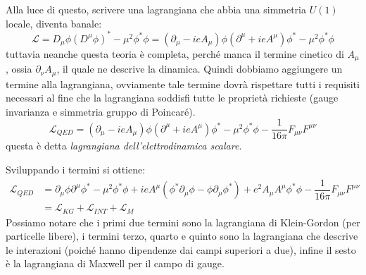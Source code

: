 Alla luce di questo, scrivere una lagrangiana che abbia una simmetria $U(1)$ locale, diventa banale:
\begin{equation}
  \mathcal{L}=D_\mu\phi(D^\mu\phi)^*-\mu^2\phi^*\phi=(\partial_\mu-ieA_\mu)\phi(\partial^\mu+ieA^\mu)\phi^*-\mu^2\phi^*\phi
\end{equation}
tuttavia neanche questa teoria è completa, perché manca il termine cinetico di $A_\mu$, ossia $\partial_\nu A_\mu$, il quale ne descrive la dinamica. Quindi dobbiamo aggiungere un termine alla lagrangiana, ovviamente tale termine dovrà rispettare tutti i requisiti necessari al fine che la lagrangiana soddisfi tutte le proprietà richieste (gauge invarianza e simmetria gruppo di Poincaré).
\begin{equation}
  \mathcal{L}_{QED}=(\partial_\mu-ieA_\mu)\phi(\partial^\mu+ieA^\mu)\phi^*-\mu^2\phi^*\phi-\dfrac{1}{16\pi}F_{\mu\nu}F^{\mu\nu}
\end{equation}
questa è detta \textit{lagrangiana dell'elettrodinamica scalare}.

Sviluppando i termini si ottiene:
\begin{equation}
\begin{aligned}
     \mathcal{L}_{QED}&=\partial_\mu\phi\partial^\mu\phi^*-\mu^2\phi^*\phi+ieA^\mu(\phi^*\partial_\mu\phi-\phi\partial_\mu\phi^*)+e^2A_\mu A^\mu\phi^*\phi-\dfrac{1}{16\pi}F_{\mu\nu}F^{\mu\nu}\\
     &=\mathcal{L}_{KG}+\mathcal{L}_{INT}+\mathcal{L}_{M}
\end{aligned}
\end{equation}
Possiamo notare che i primi due termini sono la lagrangiana di Klein-Gordon (per particelle libere), i termini terzo, quarto e quinto sono la lagrangiana che descrive le interazioni (poiché hanno dipendenze dai campi superiori a due), infine il sesto è la lagrangiana  di Maxwell per il campo di gauge. 

